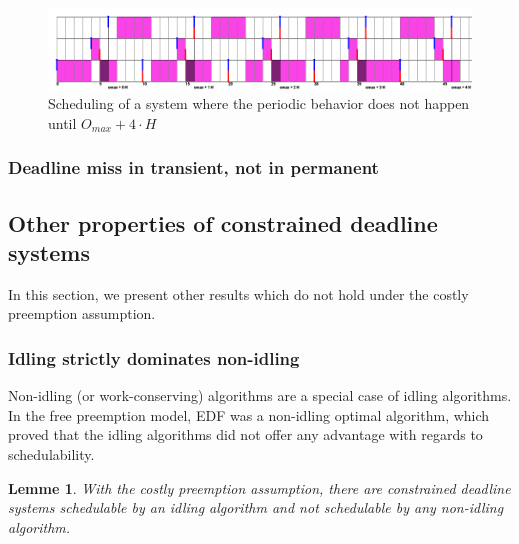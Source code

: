 \documentclass[a4paper,10pt]{article}
\newtheorem{lemme}{Lemme}
\begin{document}
        \begin{figure}[H]
        \begin{center}
            \centerline{\includegraphics[width=1.4\textwidth]{figs/longTransitive2_EDF.png}}
            \caption{Scheduling of a system where the periodic behavior does not happen until $O_{max} + 4 \cdot H$}
            \label{fig:edf_longtransitive}
        \end{center}
        \end{figure}

        \subsubsection{Deadline miss in transient, not in permanent}

    \subsection{Other properties of constrained deadline systems}


    In this section, we present other results which do not hold under the costly preemption assumption.

        \subsubsection{Idling strictly dominates non-idling}

        Non-idling (or work-conserving) algorithms are a special case of idling algorithms. In the free preemption model, EDF was a non-idling optimal algorithm, which proved that the idling algorithms did not offer any advantage with regards to schedulability.

        \begin{lemme}
        With the costly preemption assumption, there are constrained deadline systems schedulable by an idling algorithm and not schedulable by any non-idling algorithm.
        \end{lemme}
\end{document}
